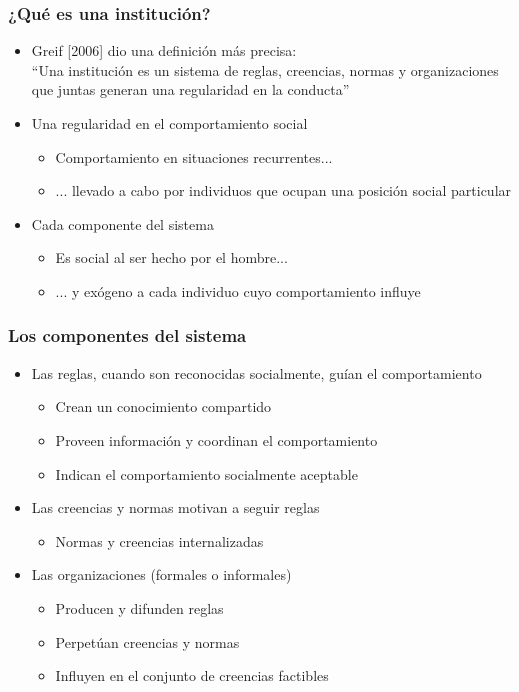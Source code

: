 \documentclass{beamer}
\begin{document}
\begin{frame}
\frametitle{¿Qué es una institución?}
\begin{itemize}
    \item Greif [2006] dio una definición más precisa:
    \\ \vspace{2mm}
    ``Una institución es un sistema de reglas, creencias, normas y organizaciones que juntas generan una regularidad en la conducta''
    \\ \vspace{2mm}
    \item Una regularidad en el comportamiento social 
    \begin{itemize}
        \item Comportamiento en situaciones recurrentes...
        \item ... llevado a cabo por individuos que ocupan una posición social particular
    \end{itemize}
    \item Cada componente del sistema
    \begin{itemize}
        \item Es social al ser hecho por el hombre...
        \item ... y exógeno a cada individuo cuyo comportamiento influye
    \end{itemize}
\end{itemize} 
\end{frame}

\begin{frame}
\frametitle{Los componentes del sistema}
\begin{itemize}
    \item Las reglas, cuando son reconocidas socialmente, guían el comportamiento
    \begin{itemize}
        \item Crean un conocimiento compartido
        \item Proveen información y coordinan el comportamiento
        \item Indican el comportamiento socialmente aceptable
    \end{itemize}
    \item Las creencias y normas motivan a seguir reglas
    \begin{itemize}
        \item Normas y creencias internalizadas
    \end{itemize}
    \item Las organizaciones (formales o informales)
    \begin{itemize}
        \item Producen y difunden reglas
        \item Perpetúan creencias y normas
        \item Influyen en el conjunto de creencias factibles
    \end{itemize}
\end{itemize}
\end{frame}
\end{document}
